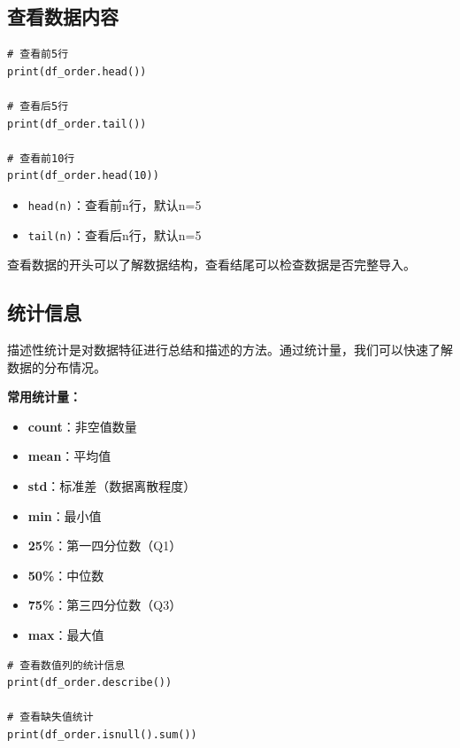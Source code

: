 \documentclass[12pt,a4paper]{article}
\begin{document}
\subsection{查看数据内容}

\begin{lstlisting}[caption={查看数据内容}]
# 查看前5行
print(df_order.head())

# 查看后5行
print(df_order.tail())

# 查看前10行
print(df_order.head(10))
\end{lstlisting}

\begin{tipbox}
\begin{itemize}
    \item \texttt{head(n)}：查看前n行，默认n=5
    \item \texttt{tail(n)}：查看后n行，默认n=5
\end{itemize}
查看数据的开头可以了解数据结构，查看结尾可以检查数据是否完整导入。
\end{tipbox}

\subsection{统计信息}

\begin{theorybox}[描述性统计]
描述性统计是对数据特征进行总结和描述的方法。通过统计量，我们可以快速了解数据的分布情况。

\textbf{常用统计量：}
\begin{itemize}
    \item \textbf{count}：非空值数量
    \item \textbf{mean}：平均值
    \item \textbf{std}：标准差（数据离散程度）
    \item \textbf{min}：最小值
    \item \textbf{25\%}：第一四分位数（Q1）
    \item \textbf{50\%}：中位数
    \item \textbf{75\%}：第三四分位数（Q3）
    \item \textbf{max}：最大值
\end{itemize}
\end{theorybox}

\begin{lstlisting}[caption={使用describe()查看统计信息}]
# 查看数值列的统计信息
print(df_order.describe())

# 查看缺失值统计
print(df_order.isnull().sum())
\end{lstlisting}
\end{document}
